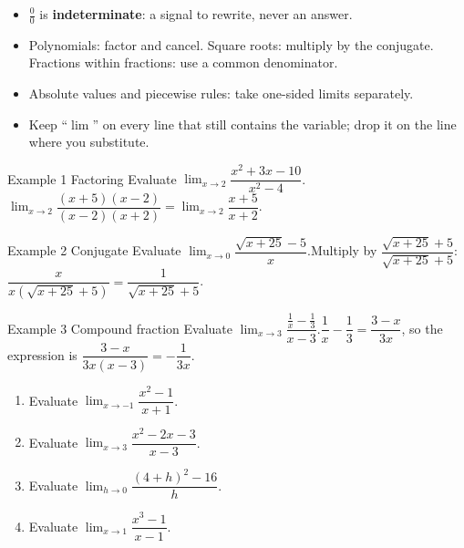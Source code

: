 \documentclass[11pt]{article}
\begin{document}

\begin{ideabox}
\begin{itemize}[leftmargin=*,itemsep=2pt,topsep=2pt]
  \item $\tfrac00$ is \textbf{indeterminate}: a signal to rewrite, never an answer.
  \item Polynomials: factor and cancel. Square roots: multiply by the conjugate. Fractions within fractions: use a common denominator.
  \item Absolute values and piecewise rules: take one-sided limits separately.
  \item Keep \textquotedblleft{}$\lim$\textquotedblright{} on every line that still contains the variable; drop it on the line where you substitute.
\end{itemize}
\end{ideabox}

\begin{example}{Example 1 \textperiodcentered{} Factoring}
Evaluate $\displaystyle\lim_{x\to 2}\dfrac{x^2+3x-10}{x^2-4}$.\soln $\displaystyle\lim_{x\to 2}\dfrac{(x+5)(x-2)}{(x-2)(x+2)}=\displaystyle\lim_{x\to 2}\dfrac{x+5}{x+2}$.
\end{example}

\begin{example}{Example 2 \textperiodcentered{} Conjugate}
Evaluate $\displaystyle\lim_{x\to 0}\dfrac{\sqrt{x+25}-5}{x}$.\soln Multiply by $\dfrac{\sqrt{x+25}+5}{\sqrt{x+25}+5}$: $\dfrac{x}{x\left(\sqrt{x+25}+5\right)}=\dfrac{1}{\sqrt{x+25}+5}$.
\end{example}

\begin{example}{Example 3 \textperiodcentered{} Compound fraction}
Evaluate $\displaystyle\lim_{x\to 3}\dfrac{\frac1x-\frac13}{x-3}$.\soln $\dfrac1x-\dfrac13=\dfrac{3-x}{3x}$, so the expression is $\dfrac{3-x}{3x(x-3)}=-\dfrac{1}{3x}$.
\end{example}

\newpage
{}

\begin{enumerate}[leftmargin=*,itemsep=2pt]
  \item Evaluate $\displaystyle\lim_{x\to -1}\dfrac{x^2-1}{x+1}$.\work{2.3cm}
  \item Evaluate $\displaystyle\lim_{x\to 3}\dfrac{x^2-2x-3}{x-3}$.\work{2.3cm}
  \item Evaluate $\displaystyle\lim_{h\to 0}\dfrac{(4+h)^2-16}{h}$.\work{2.3cm}
  \item Evaluate $\displaystyle\lim_{x\to 1}\dfrac{x^3-1}{x-1}$.\work{2.3cm}
\end{enumerate}
\end{document}
